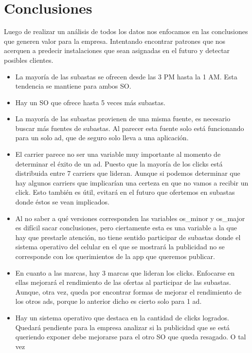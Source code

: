 \documentclass[a4paper, 12pt]{article}
\begin{document}
{{\clearpage
\section{Conclusiones}

Luego de realizar un análisis de todos los datos nos enfocamos en las conclusiones que generen valor para la empresa. Intentando
encontrar patrones que nos acerquen a predecir instalaciones que sean asignadas en el futuro y detectar posibles clientes.

\begin{itemize}
    \item La mayoría de las subastas se ofrecen desde las 3 PM hasta la 1 AM. Esta tendencia se mantiene para ambos SO.
    \item Hay un SO que ofrece hasta 5 veces más subastas.
    \item La mayoría de las subastas provienen de una misma fuente, es necesario buscar más fuentes de subastas. Al parecer
    esta fuente solo está funcionando para un solo ad, que de seguro solo lleva a una aplicación.
    \item El carrier parece no ser una variable muy importante al momento de determinar el éxito de un ad. Puesto que la mayoría de
    los clicks está distribuida entre 7 carriers que lideran. Aunque si podemos determinar que hay algunos carriers que implicarían
    una certeza en que no vamos a recibir un click. Esto también es útil, evitará en el futuro que ofertemos en subastas donde éstos
    se vean implicados.
    \item Al no saber a qué versiones corresponden las variables os\_minor y os\_major es difícil sacar conclusiones, pero ciertamente
    esta es una variable a la que hay que prestarle atención, no tiene sentido participar de subastas donde el sistema operativo
    del celular en el que se mostrará la publicidad no se corresponde con los querimientos de la app que queremos publicar.
    \item En cuanto a las marcas, hay 3 marcas que lideran los clicks. Enfocarse en ellas mejorará el rendimiento de las ofertas
    al participar de las subastas. Aunque, otra vez, queda por encontrar formas de mejorar el rendimiento de los otros ads, porque
    lo anterior dicho es cierto solo para 1 ad.
    \item Hay un sistema operativo que destaca en la cantidad de clicks logrados. Quedará pendiente para la empresa
    analizar si la publicidad que se está queriendo exponer debe mejorarse para el otro SO que queda resagado. O tal vez

\end{itemize}}}
\end{document}
